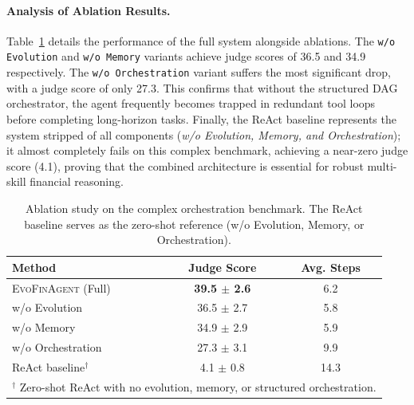 \documentclass{article}
\begin{document}
\begin{table}[h!]
\centering
\caption{Performance breakdown by task complexity.}
\label{tab:difficulty}
\end{table}

\paragraph{Analysis of Ablation Results.}
Table~\ref{tab:complex} details the performance of the full system alongside ablations. The \texttt{w/o Evolution} and \texttt{w/o Memory} variants achieve judge scores of 36.5 and 34.9 respectively. The \texttt{w/o Orchestration} variant suffers the most significant drop, with a judge score of only 27.3. This confirms that without the structured DAG orchestrator, the agent frequently becomes trapped in redundant tool loops before completing long-horizon tasks. Finally, the ReAct baseline represents the system stripped of all components (\emph{w/o Evolution, Memory, and Orchestration}); it almost completely fails on this complex benchmark, achieving a near-zero judge score (4.1), proving that the combined architecture is essential for robust multi-skill financial reasoning.

\begin{table}[h!]
\centering
\caption{Ablation study on the complex orchestration benchmark. The ReAct baseline serves as the zero-shot reference (w/o Evolution, Memory, or Orchestration).}
\label{tab:complex}
\begin{tabular}{lcc}
\toprule
Method & Judge Score & Avg. Steps \\
\midrule
\textsc{EvoFinAgent} (Full) & \textbf{39.5 $\pm$ 2.6} & 6.2 \\
\quad w/o Evolution & 36.5 $\pm$ 2.7 & 5.8 \\
\quad w/o Memory & 34.9 $\pm$ 2.9 & 5.9 \\
\quad w/o Orchestration & 27.3 $\pm$ 3.1 & 9.9 \\
\midrule
ReAct baseline$^\dagger$ & 4.1 $\pm$ 0.8 & 14.3 \\
\bottomrule
\multicolumn{3}{l}{\footnotesize $^\dagger$ Zero-shot ReAct with no evolution, memory, or structured orchestration.}
\end{tabular}
\end{table}
\end{document}
